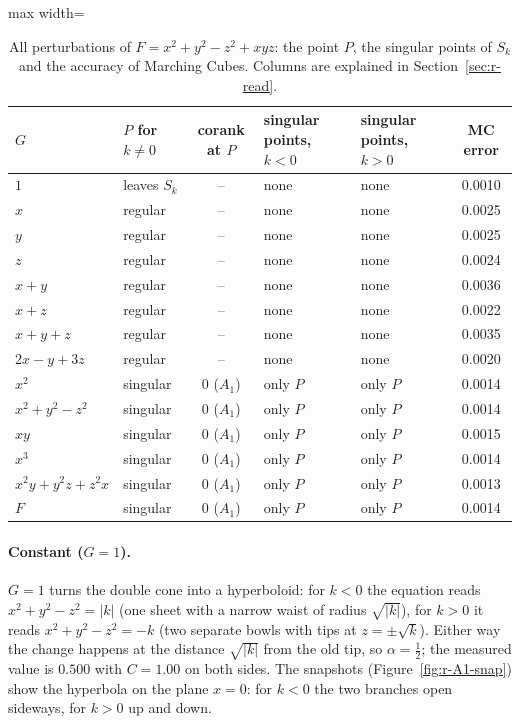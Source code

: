 \documentclass[12pt, a4paper]{article}
\theoremstyle{plain}
\theoremstyle{definition}
\theoremstyle{remark}
\theoremstyle{definition}
\begin{document}
\begin{table}[!h]
\centering
\footnotesize
\begin{adjustbox}{max width=\textwidth}
\begin{tabular}{l l c l l c}
\toprule
$G$ & $P$ for $k\neq0$ & corank at $P$ & singular points, $k<0$ & singular points, $k>0$ & MC error \\
\midrule
$1$ & leaves $S_k$ & -- & none & none & 0.0010 \\
$x$ & regular & -- & none & none & 0.0025 \\
$y$ & regular & -- & none & none & 0.0025 \\
$z$ & regular & -- & none & none & 0.0024 \\
$x+y$ & regular & -- & none & none & 0.0036 \\
$x+z$ & regular & -- & none & none & 0.0022 \\
$x+y+z$ & regular & -- & none & none & 0.0035 \\
$2x-y+3z$ & regular & -- & none & none & 0.0020 \\
$x^2$ & singular & 0 ($A_1$) & only $P$ & only $P$ & 0.0014 \\
$x^2+y^2-z^2$ & singular & 0 ($A_1$) & only $P$ & only $P$ & 0.0014 \\
$xy$ & singular & 0 ($A_1$) & only $P$ & only $P$ & 0.0015 \\
$x^3$ & singular & 0 ($A_1$) & only $P$ & only $P$ & 0.0014 \\
$x^2y+y^2z+z^2x$ & singular & 0 ($A_1$) & only $P$ & only $P$ & 0.0013 \\
$F$ & singular & 0 ($A_1$) & only $P$ & only $P$ & 0.0014 \\
\bottomrule
\end{tabular}
\end{adjustbox}
\caption[Singular points for $x^2+y^2-z^2+xyz$]{All perturbations of $F=x^2+y^2-z^2+xyz$: the point $P$, the singular points of $S_k$ and the accuracy of Marching Cubes. Columns are explained in Section~\ref{sec:r-read}.}
\label{tab:r-A1-points}
\end{table}
\paragraph{Constant ($G=1$).} $G=1$ turns the double cone into a hyperboloid:
for $k<0$ the equation reads $x^2+y^2-z^2=|k|$ (one sheet with a narrow waist of
radius $\sqrt{|k|}$), for $k>0$ it reads $x^2+y^2-z^2=-k$ (two separate bowls with
tips at $z=\pm\sqrt k$). Either way the change happens at the distance $\sqrt{|k|}$
from the old tip, so $\alpha=\tfrac12$; the measured value is $0.500$ with $C=1.00$
on both sides. The snapshots (Figure~\ref{fig:r-A1-snap}) show the hyperbola on the
plane $x=0$: for $k<0$ the two branches open sideways, for $k>0$ up and down.
\end{document}
